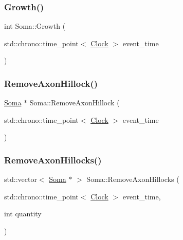 \mbox{\label{classSoma_aa6162ca8a98a14cf49ba8310db129d47}} 
\subsubsection{\texorpdfstring{Growth()}{Growth()}}
{\footnotesize\ttfamily int Soma\+::\+Growth (\begin{DoxyParamCaption}\item[{std\+::chrono\+::time\+\_\+point$<$ \mbox{\hyperlink{universe_8h_a0ef8d951d1ca5ab3cfaf7ab4c7a6fd80}{Clock}} $>$}]{event\+\_\+time }\end{DoxyParamCaption})}

\mbox{\label{classSoma_a2f75c0f716fa1f74f70697db9dfcd562}} 
\subsubsection{\texorpdfstring{Remove\+Axon\+Hillock()}{RemoveAxonHillock()}}
{\footnotesize\ttfamily \mbox{\hyperlink{classSoma}{Soma}} $\ast$ Soma\+::\+Remove\+Axon\+Hillock (\begin{DoxyParamCaption}\item[{std\+::chrono\+::time\+\_\+point$<$ \mbox{\hyperlink{universe_8h_a0ef8d951d1ca5ab3cfaf7ab4c7a6fd80}{Clock}} $>$}]{event\+\_\+time }\end{DoxyParamCaption})}

\mbox{\label{classSoma_a7281585d74015a2549a19df6cb16e3fb}} 
\subsubsection{\texorpdfstring{Remove\+Axon\+Hillocks()}{RemoveAxonHillocks()}}
{\footnotesize\ttfamily std\+::vector$<$ \mbox{\hyperlink{classSoma}{Soma}} $\ast$ $>$ Soma\+::\+Remove\+Axon\+Hillocks (\begin{DoxyParamCaption}\item[{std\+::chrono\+::time\+\_\+point$<$ \mbox{\hyperlink{universe_8h_a0ef8d951d1ca5ab3cfaf7ab4c7a6fd80}{Clock}} $>$}]{event\+\_\+time,  }\item[{int}]{quantity }\end{DoxyParamCaption})}

